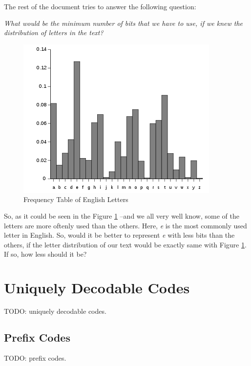 \documentclass[11pt]{article}
\begin{document}
\newpage
The rest of the document tries to answer the following question:

\begin{center}
\textit{What would be the minimum number of bits that we have to use, if we knew the distribution of letters in the text?}
\end{center}

\begin{figure}[ht!]
\centering
\includegraphics[width=\linewidth]{img/english_histogram.png}
\caption{Frequency Table of English Letters \label{fig:letter_histogram}}
\end{figure}

So, as it could be seen in the Figure \ref{fig:letter_histogram} --and we all very well know, some of the letters are more oftenly used than the others. Here, \textit{e} is the most commonly used letter in English. So, would it be better to represent \textit{e} with less bits than the others, if the letter distribution of our text would be exactly same with Figure \ref{fig:letter_histogram}. If so, how less should it be?

\section{Uniquely Decodable Codes}
TODO: uniquely decodable codes.

\subsection{Prefix Codes}
TODO: prefix codes.
\end{document}
